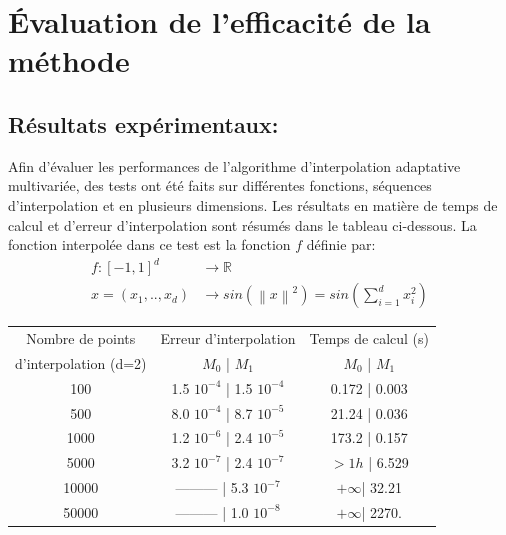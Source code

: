 \section{Évaluation de l’efficacité de la méthode}\label{sec:6}
\subsection{Résultats expérimentaux:}\label{sec:6.1}
Afin d'évaluer les performances de l'algorithme d'interpolation adaptative multivariée, des tests ont été faits sur
différentes fonctions, séquences d'interpolation et en plusieurs dimensions. Les résultats en matière de temps de calcul
et d'erreur d'interpolation sont résumés dans le tableau ci-dessous. La fonction interpolée dans ce test est la fonction $f$ définie par:
\begin{align}
		f :  \left [-1,1 \right ]^d & \rightarrow \mathbb{R} \\
		 x = (x_1,..,x_d) & \rightarrow sin(\left \| x \right \|^2) = sin(\sum_{i=1}^d x_i^2)
\end{align}

\begin{center}
\begin{tabular}{|*{3}{c|}}
  	\hline
		Nombre de points 			& 		Erreur d'interpolation 		 & 			Temps de calcul	(s) \\
		d'interpolation (d=2) &		$M_0$			 |    $M_1$        &     $M_0$	  |    $M_1$	\\
		\hline
		100 									& 1.5 $10^{-4}$ | 1.5 $10^{-4}$  &     0.172		| 	0.003		\\
		500 									& 8.0 $10^{-4}$ | 8.7 $10^{-5}$  &     21.24		| 	0.036		\\
		1000 									& 1.2 $10^{-6}$ | 2.4 $10^{-5}$  &     173.2		| 	0.157		\\
		5000 									& 3.2 $10^{-7}$	| 2.4 $10^{-7}$  &     $> 1h$   |		6.529		\\
		10000 								& 	 ---------	| 5.3 $10^{-7}$  &    $+ \infty$| 	32.21	  \\
		50000 								& 	 ---------  | 1.0 $10^{-8}$  &   	$+ \infty$| 	2270.	  \\
	  \hline
\end{tabular}
\end{center}

